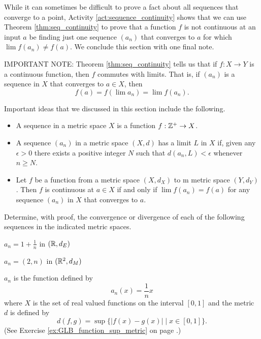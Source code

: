 While it can sometimes be difficult to prove a fact about all sequences that converge to a point, Activity \ref{act:sequence_continuity} shows that we can use Theorem \ref{thm:seq_continuity} to prove that a function $f$ is not continuous at an input $a$ be finding just one sequence $(a_n)$ that converges to $a$ for which $\lim f(a_n) \neq f(a)$. We conclude this section with one final note. 

\noindent IMPORTANT NOTE: Theorem \ref{thm:seq_continuity} tells us that if $f : X \to Y$ is a continuous function, then $f$ commutes with limits. That is, if $(a_n)$ is a sequence in $X$ that converges to $a \in X$, then 
\[f(a) = f(\lim a_n) = \lim f(a_n).\]


Important ideas that we discussed in this section include the following.
\begin{itemize}
\item A sequence in a metric space $X$ is a function $f : \mathbb{Z}^+ \to X$.
\item  A sequence $(a_n)$ in a metric space $(X,d)$ has a limit $L$ in $X$ if, given any $\epsilon > 0$ there exists a positive integer $N$ such that $d(a_n,L) < \epsilon$ whenever $n \geq N$.
\item Let $f$ be a function from a metric space $(X,d_X)$ to m metric space $(Y,d_Y)$. Then $f$ is continuous at $a \in X$ if and only if $\lim f(a_n) = f(a)$ for any sequence $(a_n)$ in $X$ that converges to $a$.
\end{itemize}


\be

\item Determine, with proof, the convergence or divergence of each of the following sequences in the indicated metric spaces.

\ba

\item $a_n = 1+\frac{1}{n}$ in $(\mathbb{R}, d_E)$

\item $a_n = (2,n)$ in $(\mathbb{R}^2, d_M)$

\item $a_n$ is the function defined by 
\[a_n(x) = \frac{1}{n}x\]
where $X$ is the set of real valued functions on the interval $[0,1]$ and the metric $d$ is defined by 
\[d(f,g) = \sup\{|f(x)-g(x)| \mid x \in [0,1]\}.\]
(See Exercise \ref{ex:GLB_function_sup_metric} on page \pageref{ex:GLB_function_sup_metric}.)


\ea


